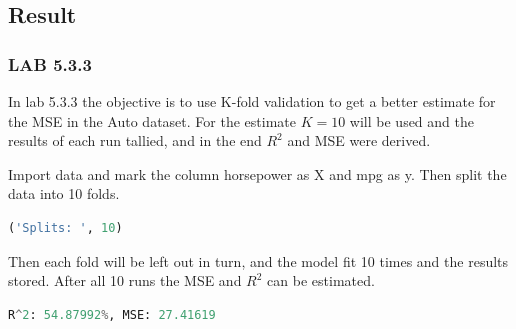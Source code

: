 \subsection{Result}
\subsubsection*{LAB 5.3.3}%
In lab 5.3.3 the objective is to use K-fold validation to get a better estimate for the MSE in the Auto dataset. For the estimate $K=10$ will be used and the results of each run tallied, and in the end $R^2$ and MSE were derived.

Import data and mark the column horsepower as X and mpg as y. Then split the data into 10 folds.
\begin{lstlisting}[language=Python]
('Splits: ', 10)
\end{lstlisting}

Then each fold will be left out in turn, and the model fit 10 times and the results stored. After all 10 runs the MSE and $R^2$ can be estimated.

\begin{lstlisting}[language=Python]
R^2: 54.87992%, MSE: 27.41619
\end{lstlisting}

